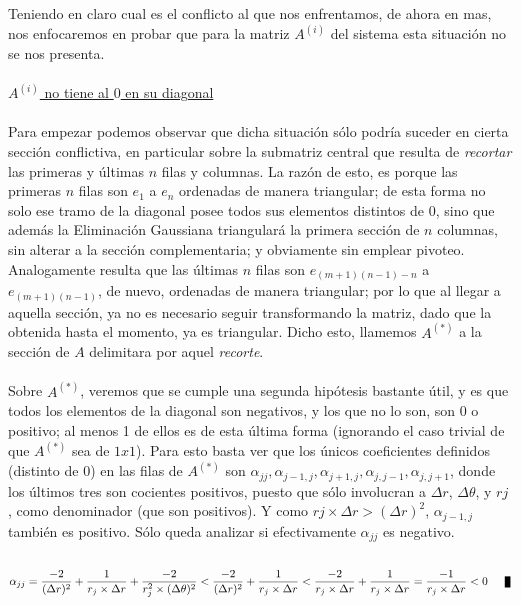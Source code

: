 Teniendo en claro cual es el conflicto al que nos enfrentamos, de ahora en mas, nos enfocaremos en probar que para la matriz $A^{(i)}$ del sistema esta situaci\'on no se nos presenta.
\\
\\
\underline{$A^{(i)}$ no tiene al $0$ en su diagonal}
\\
\\
Para empezar podemos observar que dicha situaci\'on s\'olo podr\'ia suceder en cierta sección conflictiva, en particular sobre la submatriz central que resulta de \textit{recortar} las primeras y \'ultimas $n$ filas y columnas. La razón de esto, es porque las primeras $n$ filas son $\mathit{e}_1$ a $\mathit{e}_n$ ordenadas de manera triangular; de esta forma no solo ese tramo de la diagonal posee todos sus elementos distintos de $0$, sino que adem\'as la Eliminaci\'on Gaussiana triangular\'a la primera sección de $n$ columnas, sin alterar a la sección complementaria; y obviamente sin emplear pivoteo. Analogamente resulta que las \'ultimas $n$ filas son $\mathit{e}_{(m+1)(n-1)-n}$ a $\mathit{e}_{(m+1)(n-1)}$, de nuevo, ordenadas de manera triangular; por lo que al llegar a aquella sección, ya no es necesario seguir transformando la matriz, dado que la obtenida hasta el momento, ya es triangular. Dicho esto, llamemos $A^{(*)}$ a la sección de $A$ delimitara por aquel \textit{recorte}.
\\
\\
Sobre $A^{(*)}$, veremos que se cumple una segunda hipótesis bastante útil, y es que todos los elementos de la diagonal son negativos, y los que no lo son, son $0$ o positivo; 
al menos 1 de ellos es de esta \'ultima forma (ignorando el caso trivial de que $A^{(*)}$ sea de $1x1$).
Para esto basta ver que los \'unicos coeficientes definidos (distinto de $0$) en las filas de $A^{(*)}$ son $\alpha_{jj}, \alpha_{j-1,j}, \alpha_{j+1,j}, \alpha_{j,j-1}, \alpha_{j,j+1}$, donde los \'ultimos tres son cocientes positivos, puesto que s\'olo involucran a $\Delta r$, $\Delta \theta$, y $rj$, como denominador (que son positivos). Y como $rj \times \Delta r > (\Delta r)^{2}$, $\alpha_{j-1,j}$ también es positivo. S\'olo queda analizar si efectivamente $\alpha_{jj}$ es negativo. 
\\
\\
\begin{equation}
\alpha_{jj} = \frac{-2}{(\Delta r)^2} + \frac{1}{r_j \times \Delta r} + \frac{-2}{r_j^2 \times (\Delta \theta)^2} < \frac{-2}{(\Delta r)^2} + \frac{1}{r_j \times \Delta r} < \frac{-2}{r_j \times \Delta r} + \frac{1}{r_j \times \Delta r} = \frac{-1}{r_j \times \Delta r} < 0 \qed
\end{equation}

